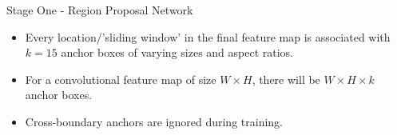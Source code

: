 \begin{frame} {Stage One - Region Proposal Network}
  \begin{figure}
    \centering
  \end{figure}
  \begin{itemize}
      \item Every location/'sliding window' in the final feature map is associated with $k = 15$ anchor boxes of varying sizes and aspect ratios.
      \item For a convolutional feature map of size $W \times H$, there will be $W \times H \times k$ anchor boxes.
      \item Cross-boundary anchors are ignored during training.
    \end{itemize}
\end{frame}

